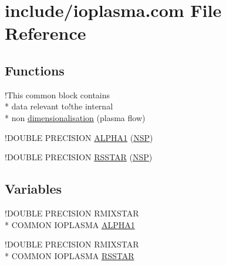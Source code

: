 \hypertarget{ioplasma_8com}{\section{include/ioplasma.com File Reference}
\label{ioplasma_8com}
}
\subsection*{Functions}
\begin{DoxyCompactItemize}
\item 
!This common block contains \\*
data relevant to!the internal \\*
non \hyperlink{ioplasma_8com_a400563a4c7d85c3c04db2d7e198c44a3}{dimensionalisation} (plasma flow)
\item 
!D\-O\-U\-B\-L\-E P\-R\-E\-C\-I\-S\-I\-O\-N \hyperlink{ioplasma_8com_a53626732946b74a72be346fdd35907d7}{A\-L\-P\-H\-A1} (\hyperlink{four_8com_aa0cef1d162909c91ecc4ab6954d16e82}{N\-S\-P})
\item 
!D\-O\-U\-B\-L\-E P\-R\-E\-C\-I\-S\-I\-O\-N \hyperlink{ioplasma_8com_a50510628e7088aa0334ba08672c12cfd}{R\-S\-S\-T\-A\-R} (\hyperlink{four_8com_aa0cef1d162909c91ecc4ab6954d16e82}{N\-S\-P})
\end{DoxyCompactItemize}
\subsection*{Variables}
\begin{DoxyCompactItemize}
\item 
!D\-O\-U\-B\-L\-E P\-R\-E\-C\-I\-S\-I\-O\-N R\-M\-I\-X\-S\-T\-A\-R \\*
C\-O\-M\-M\-O\-N I\-O\-P\-L\-A\-S\-M\-A \hyperlink{ioplasma_8com_a059782248de484bdd9a19c36ff24c43f}{A\-L\-P\-H\-A1}
\item 
!D\-O\-U\-B\-L\-E P\-R\-E\-C\-I\-S\-I\-O\-N R\-M\-I\-X\-S\-T\-A\-R \\*
C\-O\-M\-M\-O\-N I\-O\-P\-L\-A\-S\-M\-A \hyperlink{ioplasma_8com_aff825817ea4a80a3e049f2ba02de4683}{R\-S\-S\-T\-A\-R}
\end{DoxyCompactItemize}


